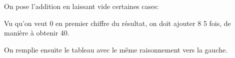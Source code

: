 \documentclass[fleqn,a4paper,nobib]{tufte-handout}
\begin{document}
\begin{solution}
    On pose l'addition en laissant vide certaines cases:

        
    Vu qu'on veut 0 en premier chiffre du résultat, on doit ajouter
    8 5 fois, de manière à obtenir 40.



    On remplie ensuite le tableau avec le même raisonnement vers la gauche.

\end{solution}
\end{document}
